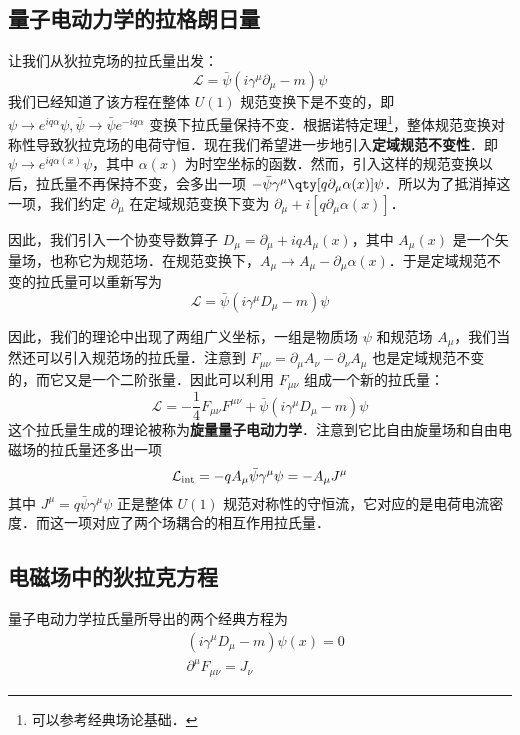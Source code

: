 

\subsection{量子电动力学的拉格朗日量}
让我们从狄拉克场的拉氏量出发：
\begin{equation}
\mathcal{L}=\bar\psi (i\gamma^\mu \partial_\mu - m)\psi 
\end{equation}
我们已经知道了该方程在整体 $U(1)$ 规范变换下是不变的，即 $\psi\rightarrow e^{iq\alpha}\psi,\bar\psi \rightarrow \bar\psi e^{-iq\alpha}$ 变换下拉氏量保持不变．根据诺特定理\footnote{可以参考经典场论基础．}，整体规范变换对称性导致狄拉克场的电荷守恒．现在我们希望进一步地引入\textbf{定域规范不变性}．即 $\psi\rightarrow e^{iq\alpha(x)}\psi $，其中 $\alpha(x)$ 为时空坐标的函数．然而，引入这样的规范变换以后，拉氏量不再保持不变，会多出一项 $-\bar\psi \gamma^\mu \qty[q\partial_\mu \alpha(x)]\psi$．所以为了抵消掉这一项，我们约定 $\partial_\mu$ 在定域规范变换下变为 $\partial_\mu+i[q\partial_\mu \alpha(x)]$．

因此，我们引入一个协变导数算子 $D_\mu = \partial_\mu +iqA_\mu(x)$，其中 $A_\mu(x)$ 是一个矢量场，也称它为规范场．在规范变换下，$A_\mu\rightarrow A_\mu - \partial_\mu \alpha(x)$．于是定域规范不变的拉氏量可以重新写为
\begin{equation}
\mathcal{L}=\bar\psi(i\gamma^\mu D_\mu-m)\psi 
\end{equation}

因此，我们的理论中出现了两组广义坐标，一组是物质场 $\psi$ 和规范场 $A_\mu$，我们当然还可以引入规范场的拉氏量．注意到 $F_{\mu\nu} = \partial_\mu A_\nu - \partial_\nu A_\mu$ 也是定域规范不变的，而它又是一个二阶张量．因此可以利用 $F_{\mu\nu}$ 组成一个新的拉氏量：
\begin{equation}
\mathcal{L}=-\frac{1}{4}F_{\mu\nu}F^{\mu\nu} + \bar\psi (i\gamma^\mu D_\mu - m)\psi
\end{equation}
这个拉氏量生成的理论被称为\textbf{旋量量子电动力学}．注意到它比自由旋量场和自由电磁场的拉氏量还多出一项
\begin{equation}
\mathcal{L}_{\rm int}=-q A_\mu \bar\psi \gamma^\mu \psi=-A_\mu J^\mu
\end{equation}
其中 $J^\mu = q\bar\psi \gamma^\mu \psi$ 正是整体 $U(1)$ 规范对称性的守恒流，它对应的是电荷电流密度．而这一项对应了两个场耦合的相互作用拉氏量．
\subsection{电磁场中的狄拉克方程}
量子电动力学拉氏量所导出的两个经典方程为
\begin{equation}
\begin{aligned}
&(i\gamma^\mu D_\mu - m)\psi(x)=0\\
&\partial^\mu F_{\mu\nu}=J_\nu
\end{aligned}
\end{equation}
